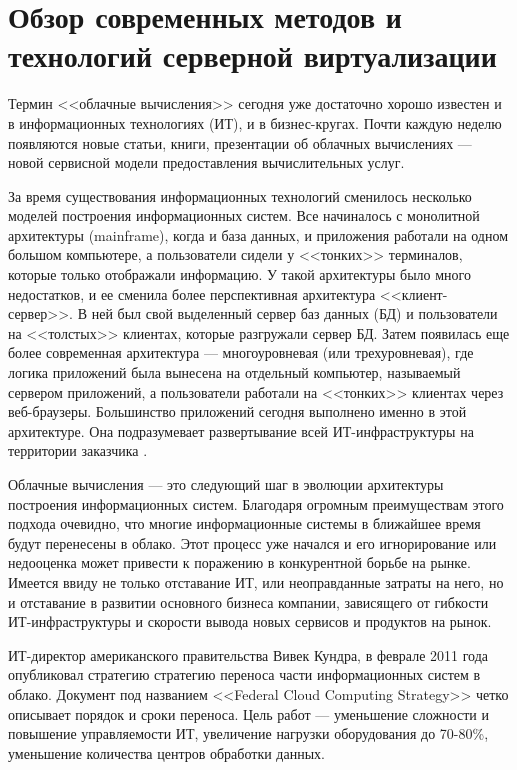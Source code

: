 \section{Обзор современных методов и технологий серверной виртуализации}

Термин <<облачные вычисления>> сегодня уже достаточно хорошо известен и в информационных технологиях (ИТ), и в бизнес-кругах.
Почти каждую неделю появляются новые статьи, книги, презентации об облачных вычислениях --- новой сервисной модели предоставления вычислительных услуг.

За время существования информационных технологий сменилось несколько моделей построения информационных систем.
Все начиналось с монолитной архитектуры (mainframe), когда и база данных, и приложения работали на одном большом компьютере, а пользователи сидели у <<тонких>> терминалов, которые только отображали информацию.
У такой архитектуры было много недостатков, и ее сменила более перспективная архитектура <<клиент-сервер>>.
В ней был свой выделенный сервер баз данных (БД) и пользователи на <<толстых>> клиентах, которые разгружали сервер БД.
Затем появилась еще более современная архитектура --- многоуровневая (или трехуровневая), где логика приложений была вынесена на отдельный компьютер, называемый сервером приложений, а пользователи работали на <<тонких>> клиентах через веб-браузеры.
Большинство приложений сегодня выполнено именно в этой архитектуре.
Она подразумевает развертывание всей ИТ-инфраструктуры на территории заказчика \cite{oracle-db}.

Облачные вычисления --- это следующий шаг в эволюции архитектуры построения информационных систем.
Благодаря огромным преимуществам этого подхода очевидно, что многие информационные системы в ближайшее время будут перенесены в облако.
Этот процесс уже начался и его игнорирование или недооценка может привести к поражению в конкурентной борьбе на рынке.
Имеется ввиду не только отставание ИТ, или неоправданные затраты на него, но и отставание в развитии основного бизнеса компании, зависящего от гибкости ИТ-инфраструктуры и скорости вывода новых сервисов и продуктов на рынок.

ИТ-директор американского правительства Вивек Кундра, в феврале 2011 года опубликовал стратегию стратегию переноса части информационных систем в облако.
Документ под названием <<Federal Cloud Computing Strategy>> четко описывает порядок и сроки переноса. 
Цель работ --- уменьшение сложности и повышение управляемости ИТ, увеличение нагрузки оборудования до 70-80\%, уменьшение количества центров обработки данных.

